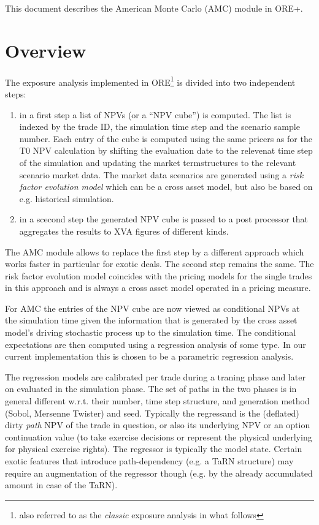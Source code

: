 \documentclass[12pt, a4paper]{article}
\begin{document}
This document describes the American Monte Carlo (AMC) module in ORE+.


\section{Overview}\label{overview}

The exposure analysis implemented in ORE\footnote{also referred to as the {\em classic} exposure analysis in what
  follows} is divided into two independent steps:

\begin{enumerate}
\item in a first step a list of NPVs (or a ``NPV cube'') is computed. The list is indexed by the trade ID, the
  simulation time step and the scenario sample number. Each entry of the cube is computed using the same pricers as for
  the T0 NPV calculation by shifting the evaluation date to the relevenat time step of the simulation and updating the
  market termstructures to the relevant scenario market data. The market data scenarios are generated using a {\em risk
    factor evolution model} which can be a cross asset model, but also be based on e.g. historical simulation.
\item in a scecond step the generated NPV cube is passed to a post processor that aggregates the results to XVA figures
  of different kinds.
\end{enumerate}

The AMC module allows to replace the first step by a different approach which works faster in particular for exotic
deals. The second step remains the same. The risk factor evolution model coincides with the pricing models for the
single trades in this approach and is always a cross asset model operated in a pricing measure.

For AMC the entries of the NPV cube are now viewed as conditional NPVs at the simulation time given the information that
is generated by the cross asset model's driving stochastic process up to the simulation time. The conditional
expectations are then computed using a regression analysis of some type. In our current implementation this is chosen to
be a parametric regression analysis.

The regression models are calibrated per trade during a traning phase and later on evaluated in the simulation
phase. The set of paths in the two phases is in general different w.r.t. their number, time step structure, and
generation method (Sobol, Mersenne Twister) and seed. Typically the regressand is the (deflated) dirty {\em path} NPV of
the trade in question, or also its underlying NPV or an option continuation value (to take exercise decisions or
represent the physical underlying for physical exercise rights). The regressor is typically the model state. Certain
exotic features that introduce path-dependency (e.g. a TaRN structure) may require an augmentation of the regressor
though (e.g. by the already accumulated amount in case of the TaRN).
\end{document}
